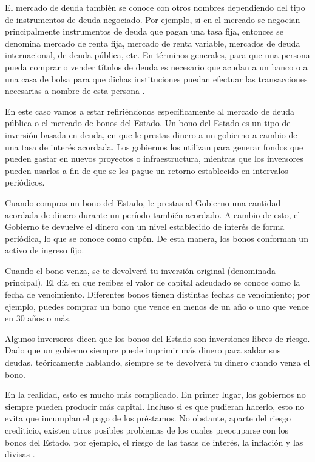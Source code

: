     El mercado de deuda también se conoce con otros nombres dependiendo del tipo de instrumentos de deuda negociado. Por ejemplo, si en el 
    mercado se negocian principalmente instrumentos de deuda que pagan una tasa fija, entonces se denomina mercado de renta fija, mercado 
    de renta variable, mercados de deuda internacional, de deuda pública, etc. En términos generales, para que una persona pueda comprar 
    o vender títulos de deuda es necesario que acudan a un banco o a una casa de bolsa para que dichas instituciones puedan efectuar las 
    transacciones necesarias a nombre de esta persona \parencite{bancomexico}.

    En este caso vamos a estar refiriéndonos específicamente al mercado de deuda pública o el mercado de bonos del Estado. Un bono del 
    Estado es un tipo de inversión basada en deuda, en que le prestas dinero a un gobierno a cambio de una tasa de interés acordada. Los 
    gobiernos los utilizan para generar fondos que pueden gastar en nuevos proyectos o infraestructura, mientras que los inversores 
    pueden usarlos a fin de que se les pague un retorno establecido en intervalos periódicos.

    Cuando compras un bono del Estado, le prestas al Gobierno una cantidad acordada de dinero durante un período también acordado. A 
    cambio de esto, el Gobierno te devuelve el dinero con un nivel establecido de interés de forma periódica, lo que se conoce como 
    cupón. De esta manera, los bonos conforman un activo de ingreso fijo.

    Cuando el bono venza, se te devolverá tu inversión original (denominada principal). El día en que recibes el valor de capital 
    adeudado se conoce como la fecha de vencimiento. Diferentes bonos tienen distintas fechas de vencimiento; por ejemplo, puedes 
    comprar un bono que vence en menos de un año o uno que vence en 30 años o más.

    Algunos inversores dicen que los bonos del Estado son inversiones libres de riesgo. Dado que un gobierno siempre puede imprimir más 
    dinero para saldar sus deudas, teóricamente hablando, siempre se te devolverá tu dinero cuando venza el bono.

    En la realidad, esto es mucho más complicado. En primer lugar, los gobiernos no siempre pueden producir más capital. Incluso si es 
    que pudieran hacerlo, esto no evita que incumplan el pago de los préstamos. No obstante, aparte del riesgo crediticio, existen otros 
    posibles problemas de los cuales preocuparse con los bonos del Estado, por ejemplo, el riesgo de las tasas de interés, la inflación 
    y las divisas \parencite{igbonos}.

